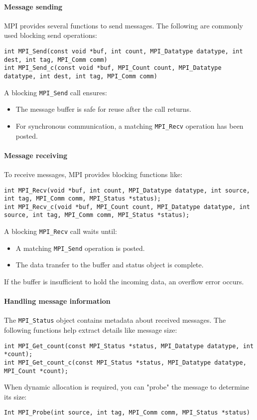 \paragraph*{Message sending}
MPI provides several functions to send messages. 
The following are commonly used blocking send operations:
\begin{lstlisting}[style=C]
int MPI_Send(const void *buf, int count, MPI_Datatype datatype, int dest, int tag, MPI_Comm comm)
int MPI_Send_c(const void *buf, MPI_Count count, MPI_Datatype datatype, int dest, int tag, MPI_Comm comm)
\end{lstlisting}
A blocking \texttt{MPI\_Send} call ensures:
\begin{itemize}
    \item The message buffer is safe for reuse after the call returns.
    \item For synchronous communication, a matching \texttt{MPI\_Recv} operation has been posted.
\end{itemize}

\paragraph*{Message receiving}
To receive messages, MPI provides blocking functions like:
\begin{lstlisting}[style=C]
int MPI_Recv(void *buf, int count, MPI_Datatype datatype, int source, int tag, MPI_Comm comm, MPI_Status *status);
int MPI_Recv_c(void *buf, MPI_Count count, MPI_Datatype datatype, int source, int tag, MPI_Comm comm, MPI_Status *status);    
\end{lstlisting}
A blocking \texttt{MPI\_Recv} call waits until:
\begin{itemize}
    \item A matching \texttt{MPI\_Send} operation is posted.
    \item The data transfer to the buffer and status object is complete.
\end{itemize}
If the buffer is insufficient to hold the incoming data, an overflow error occurs.

\paragraph*{Handling message information}
The \texttt{MPI\_Status} object contains metadata about received messages. 
The following functions help extract details like message size:
\begin{lstlisting}[style=C]
int MPI_Get_count(const MPI_Status *status, MPI_Datatype datatype, int *count);
int MPI_Get_count_c(const MPI_Status *status, MPI_Datatype datatype, MPI_Count *count);
\end{lstlisting}
When dynamic allocation is required, you can "probe" the message to determine its size:
\begin{lstlisting}[style=C]
Int MPI_Probe(int source, int tag, MPI_Comm comm, MPI_Status *status)
\end{lstlisting}

